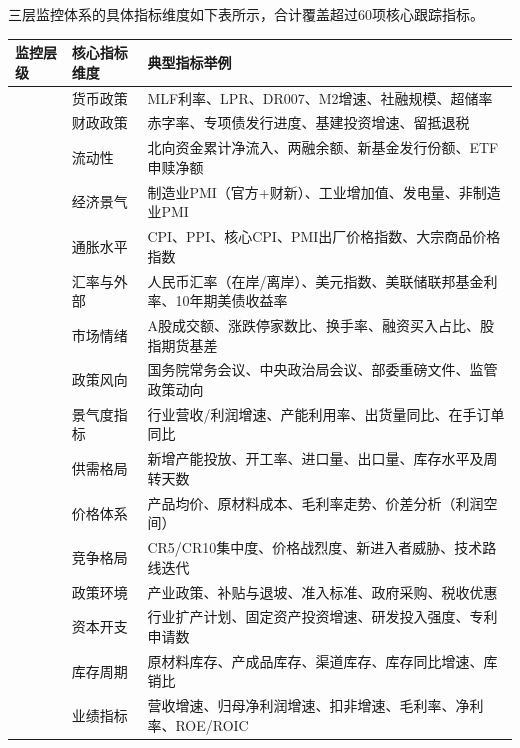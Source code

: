 三层监控体系的具体指标维度如下表所示，合计覆盖超过60项核心跟踪指标。

\begin{exhibitbox}[表9-1：三层监控体系核心指标维度]
\scriptsize
\setlength{\tabcolsep}{3.5pt}
\renewcommand{\arraystretch}{1.15}
\begin{tabularx}{\textwidth}{l X l}
\toprule
\textbf{监控层级} & \textbf{核心指标维度} & \textbf{典型指标举例} \\
\midrule
\rowcolor{navy!6}
& 货币政策 & MLF利率、LPR、DR007、M2增速、社融规模、超储率 \\
\rowcolor{navy!6}
& 财政政策 & 赤字率、专项债发行进度、基建投资增速、留抵退税 \\
\rowcolor{navy!6}
& 流动性 & 北向资金累计净流入、两融余额、新基金发行份额、ETF申赎净额 \\
\rowcolor{navy!6}
& 经济景气 & 制造业PMI（官方+财新）、工业增加值、发电量、非制造业PMI \\
\rowcolor{navy!6}
& 通胀水平 & CPI、PPI、核心CPI、PMI出厂价格指数、大宗商品价格指数 \\
\rowcolor{navy!6}
& 汇率与外部 & 人民币汇率（在岸/离岸）、美元指数、美联储联邦基金利率、10年期美债收益率 \\
\rowcolor{navy!6}
& 市场情绪 & A股成交额、涨跌停家数比、换手率、融资买入占比、股指期货基差 \\
\rowcolor{navy!6}
\multirow{-8}{*}{\textbf{宏观层}} & 政策风向 & 国务院常务会议、中央政治局会议、部委重磅文件、监管政策动向 \\
\midrule
\rowcolor{accentblue!6}
& 景气度指标 & 行业营收/利润增速、产能利用率、出货量同比、在手订单同比 \\
\rowcolor{accentblue!6}
& 供需格局 & 新增产能投放、开工率、进口量、出口量、库存水平及周转天数 \\
\rowcolor{accentblue!6}
& 价格体系 & 产品均价、原材料成本、毛利率走势、价差分析（利润空间） \\
\rowcolor{accentblue!6}
& 竞争格局 & CR5/CR10集中度、价格战烈度、新进入者威胁、技术路线迭代 \\
\rowcolor{accentblue!6}
& 政策环境 & 产业政策、补贴与退坡、准入标准、政府采购、税收优惠 \\
\rowcolor{accentblue!6}
& 资本开支 & 行业扩产计划、固定资产投资增速、研发投入强度、专利申请数 \\
\rowcolor{accentblue!6}
\multirow{-7}{*}{\textbf{行业层}} & 库存周期 & 原材料库存、产成品库存、渠道库存、库存同比增速、库销比 \\
\midrule
\rowcolor{riskgreen!6}
& 业绩指标 & 营收增速、归母净利润增速、扣非增速、毛利率、净利率、ROE/ROIC \\

\end{tabularx}
\end{exhibitbox}
